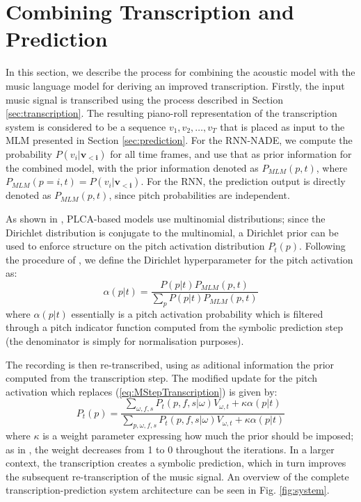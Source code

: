 \section{Combining Transcription and Prediction}
\label{sec:combination}


In this section, we describe the process for combining the acoustic model with the music language model for deriving an improved transcription. Firstly, the input music signal is transcribed using the process described in Section \ref{sec:transcription}. The resulting piano-roll representation of the transcription system is considered to be a sequence $v_1, v_2, \ldots, v_T$ that is placed as input to the MLM presented in Section \ref{sec:prediction}. For the RNN-NADE, we compute the probability $P(v_i|\mathbf{v_{<i}})$ for all time frames, and use that as prior information for the combined model, with the prior information  denoted as $P_{\mathit{MLM}}(p,t)$, where $P_{\mathit{MLM}}(p=i,t)=P(v_i|\mathbf{v_{<i}})$. For the RNN, the prediction output is directly denoted as $P_{\mathit{MLM}}(p,t)$, since pitch probabilities are independent.

As shown in \cite{Smaragdis2009}, PLCA-based models use multinomial distributions; since the Dirichlet distribution is conjugate to the multinomial, a Dirichlet prior can be used to enforce structure on the pitch activation distribution $P_{t}(p)$. Following the procedure of \cite{Smaragdis2009}, we define the Dirichlet hyperparameter for the pitch activation as:
\begin{equation}
 \alpha(p|t) = \frac{P(p|t)P_{\mathit{MLM}}(p,t)}{\sum_{p}P(p|t)P_{\mathit{MLM}}(p,t)}
\end{equation}
where $\alpha(p|t)$ essentially is a pitch activation probability which is filtered through a pitch indicator function computed from the symbolic prediction step (the denominator is simply for normalisation purposes).

The recording is then re-transcribed, using as aditional information the prior computed from the transcription step. The modified update for the pitch activation which replaces (\ref{eq:MStepTranscription}) is given by:
\begin{equation}
 P_{t}(p) = \frac{\sum_{\omega,f,s}P_{t}(p,f,s|\omega)V_{\omega,t}+\kappa\alpha(p|t)}{\sum_{p,\omega,f,s}P_{t}(p,f,s|\omega)V_{\omega,t}+\kappa\alpha(p|t)} \label{eq:modifiedMStepPitchActivation}
\end{equation}
where $\kappa$ is a weight parameter expressing how much the prior should be imposed; as in \cite{Smaragdis2009}, the weight decreases from 1 to 0 throughout the iterations. In a larger context, the transcription creates a symbolic prediction, which in turn improves the subsequent re-transcription of the music signal. An overview of the complete transcription-prediction system architecture can be seen in Fig. \ref{fig:system}.

